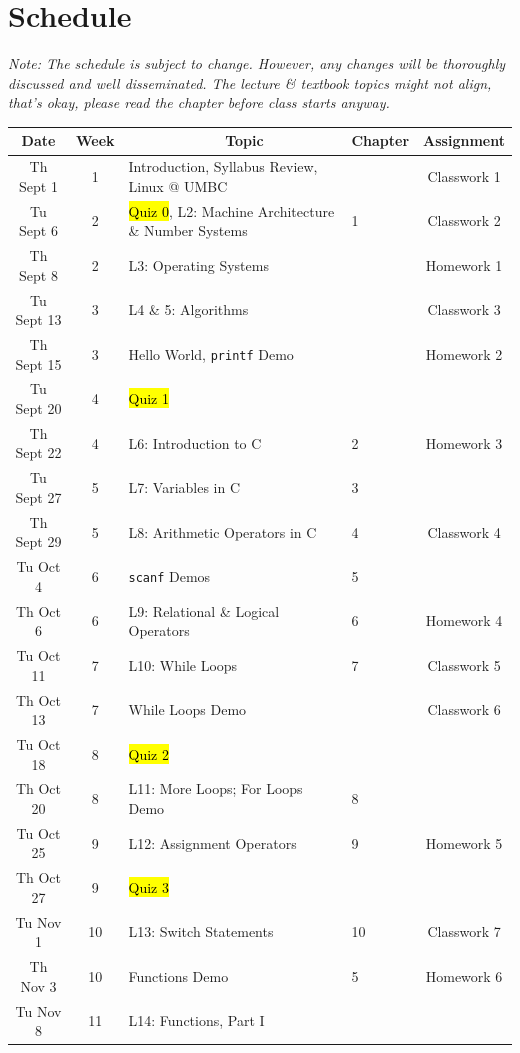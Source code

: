 \documentclass[letter,11pt]{article}
\begin{document}
\section*{Schedule}
\textit{Note: The schedule is subject to change. However, any changes will be thoroughly discussed and well disseminated. The lecture \& textbook topics might not align, that's okay, please read the chapter before class starts anyway.}

\iffalse %
\small
\begin{tabular}{c c l l c}
Date & Week & ~~~~~~~~~~~~Topic & Chapter & Assignment \\
\hline
Th Sept 1  & 1  & Introduction, Syllabus Review, Linux @ UMBC & & Classwork 1  \\
Tu Sept 6  & 2  & \hl{Quiz 0}, L2: Machine Architecture \& Number Systems & 1 & Classwork 2 \\
Th Sept 8  & 2  & L3: Operating Systems & & Homework 1 \\
Tu Sept 13 & 3  & L4 \& 5: Algorithms & & Classwork 3 \\
Th Sept 15 & 3  & Hello World, \texttt{printf} Demo & & Homework 2 \\
Tu Sept 20 & 4  & \hl{Quiz 1} & &  \\
Th Sept 22 & 4  & L6: Introduction to C & 2 & Homework 3 \\
Tu Sept 27 & 5  & L7: Variables in C & 3 \\
Th Sept 29 & 5  & L8: Arithmetic Operators in C & 4 & Classwork 4 \\ \hline
Tu Oct 4   & 6  & \texttt{scanf} Demos & 5 & \\
Th Oct 6   & 6  & L9: Relational \& Logical Operators & 6 & Homework 4 \\
Tu Oct 11  & 7  & L10: While Loops & 7 & Classwork 5 \\
Th Oct 13  & 7  & While Loops Demo & & Classwork 6 \\
Tu Oct 18  & 8  & \hl{Quiz 2} & & \\
Th Oct 20  & 8  & L11: More Loops; For Loops Demo & 8 & \\
Tu Oct 25  & 9  & L12: Assignment Operators & 9 & Homework 5 \\
Th Oct 27  & 9  & \hl{Quiz 3} & & \\ \hline
Tu Nov 1   & 10 & L13: Switch Statements & 10 & Classwork 7 \\
Th Nov 3   & 10 & Functions Demo  & 5 & Homework 6 \\
Tu Nov 8   & 11 & L14: Functions, Part I  & \\

\end{tabular}
\end{document}

